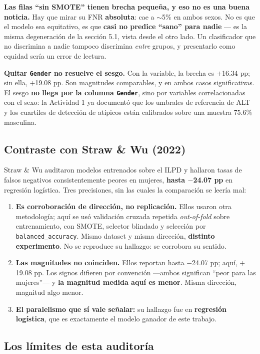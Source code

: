 \documentclass[10pt,a4paper]{article}
\begin{document}
\textbf{Las filas ``sin SMOTE'' tienen brecha pequeña, y eso no es una buena noticia.} Hay que mirar su FNR \textbf{absoluta}: cae a $\sim$5\% en ambos sexos. No es que el modelo sea equitativo, es que \textbf{casi no predice ``sano'' para nadie} --- es la misma degeneración de la sección 5.1, vista desde el otro lado. Un clasificador que no discrimina a nadie tampoco discrimina \textit{entre} grupos, y presentarlo como equidad sería un error de lectura.

\textbf{Quitar \texttt{Gender} no resuelve el sesgo.} Con la variable, la brecha es $+$16.34 pp; sin ella, $+$19.08 pp. Son magnitudes comparables, y en ambos casos significativas. El sesgo \textbf{no llega por la columna \texttt{Gender}}, sino por variables correlacionadas con el sexo: la Actividad 1 ya documentó que los umbrales de referencia de ALT y los cuartiles de detección de atípicos están calibrados sobre una muestra 75.6\% masculina.

\subsection{Contraste con Straw \& Wu (2022)}

Straw \& Wu auditaron modelos entrenados sobre el ILPD y hallaron tasas de falsos negativos consistentemente peores en mujeres, \textbf{hasta $-$24.07 pp} en regresión logística. Tres precisiones, sin las cuales la comparación se leería mal:

\begin{enumerate}
\item \textbf{Es corroboración de dirección, no replicación.} Ellos usaron otra metodología; aquí se usó validación cruzada repetida \textit{out-of-fold} sobre entrenamiento, con SMOTE, selector blindado y selección por \texttt{balanced\_accuracy}. Mismo dataset y misma dirección, \textbf{distinto experimento}. No se reproduce su hallazgo: se corrobora su sentido.
\item \textbf{Las magnitudes no coinciden.} Ellos reportan hasta $-$24.07 pp; aquí, $+$19.08 pp. Los signos difieren por convención ---ambos significan ``peor para las mujeres''--- y \textbf{la magnitud medida aquí es menor}. Misma dirección, magnitud algo menor.
\item \textbf{El paralelismo que sí vale señalar:} su hallazgo fue en \textbf{regresión logística}, que es exactamente el modelo ganador de este trabajo.
\end{enumerate}

\subsection{Los límites de esta auditoría}
\end{document}
